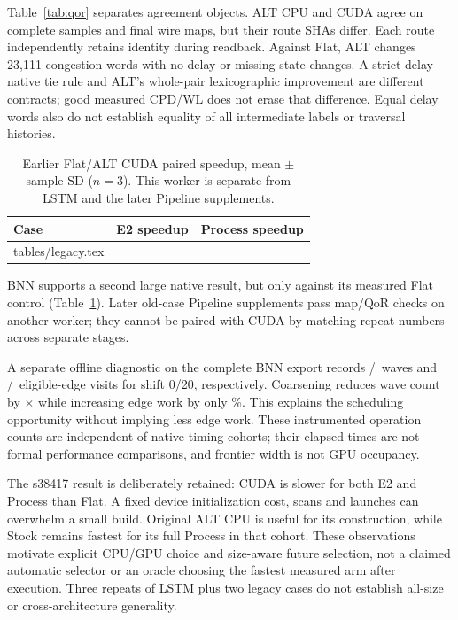 \documentclass[conference,10pt,letterpaper]{IEEEtran}
\makeatletter
\newcommand{\tableinput}[1]{\@@input #1 }
\makeatother
\begin{document}
Table~\ref{tab:qor} separates agreement objects. ALT CPU and CUDA agree on complete samples and final wire maps, but their route SHAs differ. Each route independently retains identity during readback. Against Flat, ALT changes 23,111 congestion words with no delay or missing-state changes. A strict-delay native tie rule and ALT's whole-pair lexicographic improvement are different contracts; good measured CPD/WL does not erase that difference. Equal delay words also do not establish equality of all intermediate labels or traversal histories.

\begin{table}[t]\centering\caption{Earlier Flat/ALT CUDA paired speedup, mean $\pm$ sample SD ($n=3$). This worker is separate from LSTM and the later Pipeline supplements.}\label{tab:legacy}
\begin{tabular}{lrr}\toprule Case & E2 speedup & Process speedup\\\midrule
\tableinput{tables/legacy.tex}
\bottomrule\end{tabular}\end{table}

BNN supports a second large native result, but only against its measured Flat control (Table~\ref{tab:legacy}). Later old-case Pipeline supplements pass map/QoR checks on another worker; they cannot be paired with CUDA by matching repeat numbers across separate stages.

A separate offline diagnostic on the complete BNN export records \BnnWavesZero/\BnnWavesTwenty\ waves and \BnnEdgesZero/\BnnEdgesTwenty\ eligible-edge visits for shift 0/20, respectively. Coarsening reduces wave count by \BnnWaveRatio$\times$ while increasing edge work by only \BnnEdgeIncrease\%. This explains the scheduling opportunity without implying less edge work. These instrumented operation counts are independent of native timing cohorts; their elapsed times are not formal performance comparisons, and frontier width is not GPU occupancy.

The s38417 result is deliberately retained: CUDA is slower for both E2 and Process than Flat. A fixed device initialization cost, scans and launches can overwhelm a small build. Original ALT CPU is useful for its construction, while Stock remains fastest for its full Process in that cohort. These observations motivate explicit CPU/GPU choice and size-aware future selection, not a claimed automatic selector or an oracle choosing the fastest measured arm after execution. Three repeats of LSTM plus two legacy cases do not establish all-size or cross-architecture generality.
\end{document}
